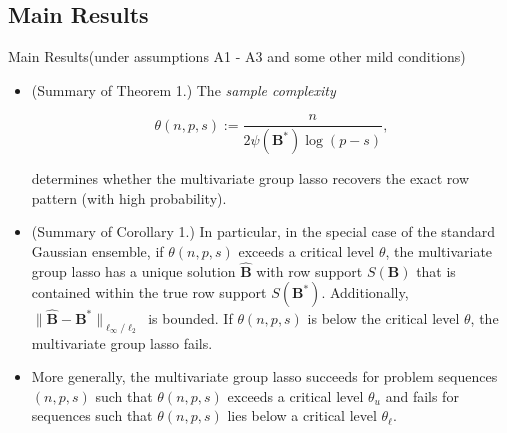 \documentclass[notes]{beamer}       %
\begin{document}

\subsection{Main Results}



\begin{frame}{Main Results}{(under assumptions A1 - A3 and some other mild conditions)}
  \begin{itemize}
  \item {
    (Summary of Theorem 1.) The \textit{sample complexity}
    
    \[
    \theta(n,p,s):= \frac{n}{2 \psi(\boldsymbol{B}^*) \log(p - s)},
    \]
    
    determines whether the multivariate group lasso recovers the exact row pattern (with high probability).
    
  }
    \item{
    (Summary of Corollary 1.) In particular, in the special case of the standard Gaussian ensemble, if \(\theta(n, p, s)\) exceeds a critical level \(\theta\), the multivariate group lasso has a unique solution \(\hat{\boldsymbol{B}}\) with row support \(S(\boldsymbol{B})\) that is contained within the true row support \(S(\boldsymbol{B}^*)\). Additionally, \(\lVert \hat{\boldsymbol{B}} - \boldsymbol{B}^* \rVert_{\ell_\infty/\ell_2}\) is bounded. If \(\theta(n, p, s)\) is below the critical level \(\theta\), the multivariate group lasso fails.
  }
\item {   
    More generally, the multivariate group lasso succeeds for problem sequences \((n, p, s)\) such that \(\theta(n, p, s)\) exceeds a critical level \(\theta_u\) and fails for sequences such that \(\theta(n, p, s)\) lies below a critical level \(\theta_{\ell}\).
  }


  
   
  \end{itemize}
\end{frame}
\end{document}

